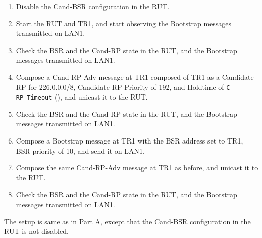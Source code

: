 \documentclass[11pt]{report}
\begin{document}
\begin{enumerate}

  \item Disable the Cand-BSR configuration in the RUT.

  \item Start the RUT and TR1, and start observing the Bootstrap messages
  transmitted on LAN1.

  \item Check the BSR and the Cand-RP state in the RUT, and the Bootstrap
  messages transmitted on LAN1.

  \item Compose a Cand-RP-Adv message at TR1 composed of TR1 as a
   Candidate-RP for 226.0.0.0/8, Candidate-RP Priority of 192, and Holdtime of
   \verb=C-RP_Timeout= ({\PimsmCRPTimeout}), and unicast it to the RUT.

  \item Check the BSR and the Cand-RP state in the RUT, and the Bootstrap
  messages transmitted on LAN1.

  \item Compose a Bootstrap message at TR1 with the BSR address set to TR1,
  BSR priority of 10, and send it on LAN1.

  \item Compose the same Cand-RP-Adv message at TR1 as before, and unicast it
  to the RUT.

  \item Check the BSR and the Cand-RP state in the RUT, and the Bootstrap
  messages transmitted on LAN1.

\end{enumerate}


The setup is same as in Part A, except that the Cand-BSR configuration in the
RUT is not disabled.

\end{document}
